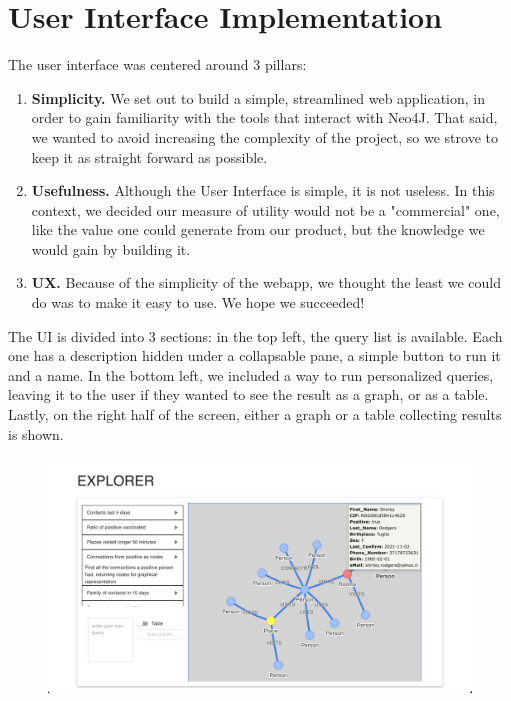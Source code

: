 \documentclass[table, 12pt]{article}
\begin{document}
\section{User Interface Implementation}
The user interface was centered around 3 pillars:
\begin{enumerate}
    \item \textbf{Simplicity.} We set out to build a simple, streamlined web application, in order to gain familiarity with the tools that interact with Neo4J. That said, we wanted to avoid increasing the complexity of the project, so we strove to keep it as straight forward as possible.
    \item \textbf{Usefulness.} Although the User Interface is simple, it is not useless. In this context, we decided our measure of utility would not be a "commercial" one, like the value one could generate from our product, but the knowledge we would gain by building it.
    \item \textbf{UX.} Because of the simplicity of the webapp, we thought the least we could do was to make it easy to use. We hope we succeeded!
\end{enumerate}
The UI is divided into 3 sections: in the top left, the query list is available. Each one has a description hidden under a collapsable pane, a simple button to run it and a name. In the bottom left, we included a way to run personalized queries, leaving it to the user if they wanted to see the result as a graph, or as a table. Lastly, on the right half of the screen, either a graph or a table collecting results is shown.
\begin{figure}[H]
    \centering
    \includegraphics[width=\textwidth]{images/UI1.png}
\end{figure}
\end{document}
